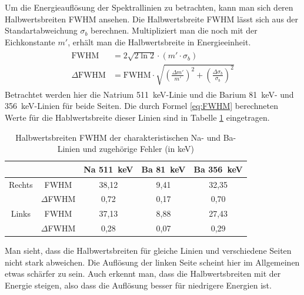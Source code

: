 Um die Energieauflösung der Spektrallinien zu betrachten, kann man sich deren Halbwertsbreiten FWHM ansehen.
Die Halbwertsbreite FWHM lässt sich aus der Standartabweichung $\sigma_b$ berechnen.
Multipliziert man die noch mit der Eichkonstante $m'$, erhält man die Halbwertsbreite in Energieeinheit.
\begin{align}
    \begin{split}
        \text{FWHM} &= 2 \sqrt{2 \ln 2} \cdot (m' \cdot \sigma_b) \\
        \Delta \text{FWHM} &= \text{FWHM} \cdot \sqrt{\left( \frac{\Delta m'}{m'} \right)^2 + \left( \frac{\Delta \sigma_b}{\sigma_b} \right)^2}
    \end{split}
    \label{eq:FWHM}
\end{align}
Betrachtet werden hier die Natrium \SI{511}{\kilo\eV}-Linie und die Barium \SI{81}{\kilo\eV}- und \SI{356}{\kilo\eV}-Linien für beide Seiten.
Die durch Formel \ref{eq:FWHM} berechneten Werte für die Hablwertsbreite dieser Linien sind in Tabelle \ref{tab:Halbwertsbreiten} eingetragen.
\begin{table}
    \centering
    \caption{Halbwertsbreiten FWHM der charakteristischen Na- und Ba-Linien und zugehörige Fehler (in \si{\kilo\eV})}
    \begin{tabular}{|c|c|c|c|c|}
        \hline
         & & Na \SI{511}{\kilo\electronvolt} & Ba \SI{81}{\kilo\electronvolt} & Ba \SI{356}{\kilo\electronvolt} \\ \hline \hline
        
         Rechts & FWHM & 38,12 & 9,41 & 32,35 \\ \hline
         & $\Delta$FWHM & 0,72 & 0,17 & 0,70 \\ \hline \hline

         Links & FWHM & 37,13 & 8,88 & 27,43 \\ \hline
         & $\Delta$FWHM & 0,28 & 0,07 & 0,29 \\ \hline
    \end{tabular}
    \label{tab:Halbwertsbreiten}
\end{table}

Man sieht, dass die Halbwertsbreiten für gleiche Linien und verschiedene Seiten nicht stark abweichen.
Die Auflösung der linken Seite scheint hier im Allgemeinen etwas schärfer zu sein.
Auch erkennt man, dass die Halbwertsbreiten mit der Energie steigen, also dass die Auflösung besser für niedrigere Energien ist.

